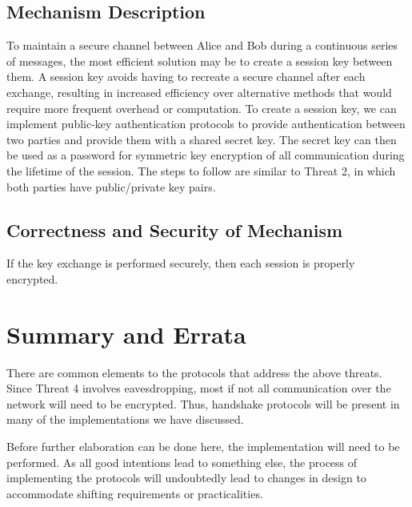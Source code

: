 \documentclass[11pt]{article}
\begin{document}
\subsection{Mechanism Description}
To maintain a secure channel between Alice and Bob during a continuous series of messages, the most efficient solution may be to create a session key between them. A session key avoids having to recreate a secure channel after each exchange, resulting in increased efficiency over alternative methods that would require more frequent overhead or computation. To create a session key, we can implement public-key authentication protocols to provide authentication between two parties and provide them with a shared secret key. The secret key can then be used as a password for symmetric key encryption of all communication during the lifetime of the session. The steps to follow are similar to Threat 2, in which both parties have public/private key pairs.
\subsection{Correctness and Security of Mechanism}
If the key exchange is performed securely, then each session is properly encrypted.
\section{Summary and Errata}
There are common elements to the protocols that address the above threats. Since Threat 4 involves eavesdropping, most if not all communication over the network will need to be encrypted. Thus, handshake protocols will be present in many of the implementations we have discussed.

Before further elaboration can be done here, the implementation will need to be performed. As all good intentions lead to something else, the process of implementing the protocols will undoubtedly lead to changes in design to accommodate shifting requirements or practicalities.
\end{document}
